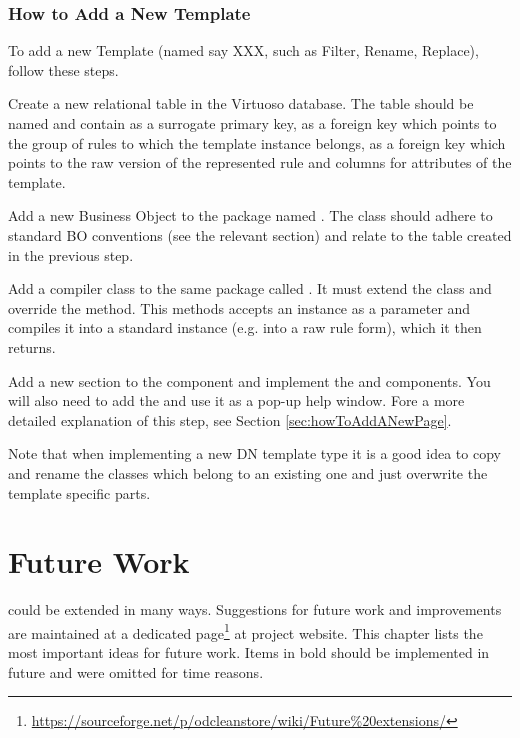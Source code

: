 \subsection{How to Add a New \DN Template}
\label{sec:howToAddANewDNTemplate}

To add a new \DN Template (named say XXX, such as Filter, Rename, Replace), follow these steps.

Create a new relational table in the Virtuoso database. The table should be named  and contain  as a surrogate primary key,  as a foreign key which points to the group of rules to which the template instance belongs,  as a foreign key which points to the raw version of the represented rule and columns for attributes of the template.

Add a new Business Object to the  package named . The class should adhere to standard BO conventions (see the relevant section) and relate to the table created in the previous step.

Add a compiler class to the same package called . It must extend the  class and override the  method. This methods accepts an  instance as a parameter and compiles it into a standard  instance (e.g. into a raw rule form), which it then returns.

Add a new section to the  component and implement the \linebreak{} and  components. You will also need to add the  and use it as a pop-up help window. Fore a more detailed explanation of this step, see Section \ref{sec:howToAddANewPage}.

Note that when implementing a new DN template type it is a good idea to copy and rename the classes which belong to an existing one and just overwrite the template specific parts.



\chapter{Future Work}
\odcs could be extended in many ways. Suggestions for future work and improvements are maintained at a dedicated page\footnote{\url{https://sourceforge.net/p/odcleanstore/wiki/Future\%20extensions/}} at project website. This chapter lists the most important ideas for future work. Items in bold should be implemented in future and were omitted for time reasons.


